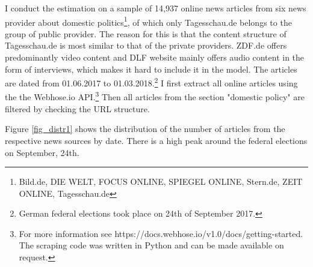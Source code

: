 \documentclass[12pt,a4paper,notitlepage]{article}
\begin{document}
I conduct the estimation on a sample of 14,937 online news articles from six news provider about domestic politics\footnote{Bild.de, DIE WELT, FOCUS ONLINE, SPIEGEL ONLINE, Stern.de, ZEIT ONLINE, Tagesschau.de}, of which only Tagesschau.de belongs to the group of public provider. The reason for this is that the content structure of Tagesschau.de is most similar to that of the private providers. ZDF.de offers predominantly video content and DLF website mainly offers audio content in the form of interviews, which makes it hard to include it in the model. The articles are dated from 01.06.2017 to 01.03.2018.\footnote{German federal elections took place on 24th of September 2017.} I first extract all online articles using the the Webhose.io API.\footnote{For more information see https://docs.webhose.io/v1.0/docs/getting-started. The scraping code was written in Python and can be made available on request.} Then all articles from the section "domestic policy" are filtered by checking the URL structure.

Figure \ref{fig_distr1} shows the distribution of the number of articles from the respective news sources by date. There is a high peak around the federal elections on September, 24th.  
\end{document}
